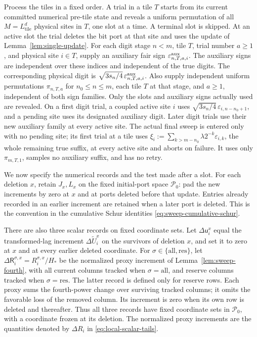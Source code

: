 Process the tiles in a fixed order.  A trial in a tile \(T\) starts
from its current committed numerical pre-tile state and reveals a
uniform permutation of all \(M=L_{\mathrm{tile}}^d\) physical sites in
\(T\), one slot at a time.  A terminal slot is skipped.  At an active
slot the trial deletes the bit port at that site and uses the update of
Lemma~\ref{lem:single-update}.  For each digit stage \(n<m\), tile \(T\),
trial number \(a\ge1\), and physical site \(i\in T\), supply an auxiliary
fair sign \(\varepsilon^{\rm aux}_{n,T,a,i}\).  The auxiliary signs are
independent over these indices and independent of the true digits.
The corresponding physical digit is
\(\sqrt{3s_n/4}\,\varepsilon^{\rm aux}_{n,T,a,i}\).  Also supply
independent uniform permutations \(\pi_{n,T,a}\) for
\(n_0\le n\le m\), each tile \(T\) at that stage, and \(a\ge1\),
independent of both sign families.  Only
the slots and auxiliary signs actually used are revealed.  On a first
digit trial, a coupled active site \(i\) uses
\(\sqrt{3s_n/4}\,\varepsilon_{i,n-n_0+1}\), and a pending site uses
its designated auxiliary digit.  Later digit trials
use their new auxiliary family at every active site.  The actual final
sweep is entered only with no pending site; its first trial at a tile
uses \(\xi_i:=\sum_{k>m-n_0}\lambda2^{-k}\varepsilon_{i,k}\), the whole
remaining true suffix, at every active site and aborts on
failure.  It uses only \(\pi_{m,T,1}\), samples no auxiliary suffix,
and has no retry.

We now specify the numerical records and the test made after a slot.
For each deletion \(x\), retain \(J_x,L_x\) on the fixed initial-port
space \(\mathcal P_0\): pad the new increments by zero at \(x\) and at
ports deleted before that update.  Entries already recorded in an
earlier increment are retained when a later port is deleted.  This is
the convention in the cumulative Schur identities
\eqref{eq:sweep-cumulative-schur}.

There are also three scalar records on fixed coordinate sets.  Let
\(\Delta\mathsf u_i^x\) equal the transformed-lag increment
\(\Delta\widetilde U_i^x\) on the survivors of deletion \(x\), and set
it to zero at \(x\) and at every earlier deleted coordinate.  For
\(\sigma\in\{\mathrm{all},\mathrm{res}\}\), let
\(\Delta\mathsf R_i^{\sigma,x}=R_i^{\sigma,x}/H_*\) be the normalized proxy
increment of Lemma~\ref{lem:sweep-fourth}, with all current columns
tracked when \(\sigma=\mathrm{all}\), and reserve columns tracked when
\(\sigma=\mathrm{res}\).  The latter record is defined only for reserve
rows.  Each proxy sums the fourth-power change over surviving tracked
columns; it omits the favorable loss of the removed column.  Its
increment is zero when its own row is deleted and thereafter.  Thus all
three records have fixed coordinate sets in \(\mathcal P_0\), with a
coordinate frozen at its deletion.  The normalized proxy increments are
the quantities denoted by \(\Delta R_i\) in
\eqref{eq:local-scalar-tails}.

